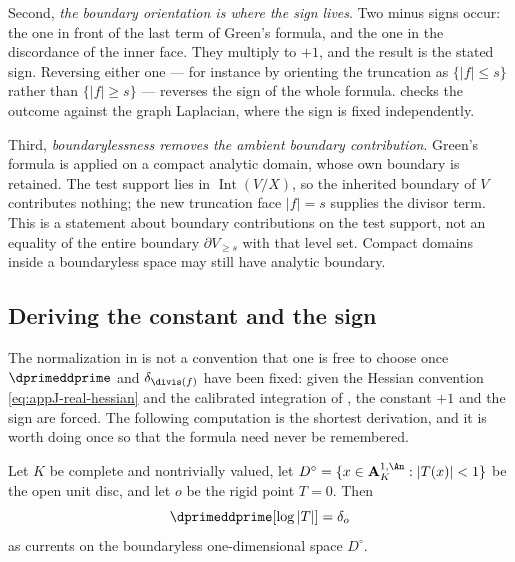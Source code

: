 Second, \emph{the boundary orientation is where the sign lives}.  Two minus
signs occur: the one in front of the last term of Green's formula, and the
one in the discordance of the inner face.  They multiply to $+1$, and the
result is the stated sign.  Reversing either one --- for instance by
orienting the truncation as $\{|f|\le s\}$ rather than $\{|f|\ge s\}$ ---
reverses the sign of the whole formula.   checks the
outcome against the graph Laplacian, where the sign is fixed independently.

Third, \emph{boundarylessness removes the ambient boundary contribution}.
Green's formula is applied on a compact analytic domain, whose own boundary
is retained. The test support lies in $\operatorname{Int}(V/X)$, so the
inherited boundary of $V$ contributes nothing; the new truncation face
$|f|=s$ supplies the divisor term. This is a statement about boundary
contributions on the test support, not an equality of the entire boundary
$\partial V_{\ge s}$ with that level set. Compact domains inside a
boundaryless space may still have analytic boundary.

\subsection{Deriving the constant and the sign}
\label{sec:ch15-pl-constant}

The normalization in  is not a convention that
one is free to choose once $\dprimeddprime$ and $\delta_{\divis(f)}$ have
been fixed: given the Hessian convention \eqref{eq:appJ-real-hessian} and the
calibrated integration of , the constant
$+1$ and the sign are forced.  The following computation is the shortest
derivation, and it is worth doing once so that the formula need never be
remembered.

\begin{lemma}
\label{lem:ch15-pl-constant}
Let $K$ be complete and nontrivially valued, let
$D^\circ=\{x\in\mathbf A^{1,\An}_K:|T(x)|<1\}$ be the open unit disc, and let
$o$ be the rigid point $T=0$.  Then
\[
 \dprimeddprime[\log|T|]=\delta_o
\]
as currents on the boundaryless one-dimensional space $D^\circ$.
\end{lemma}


